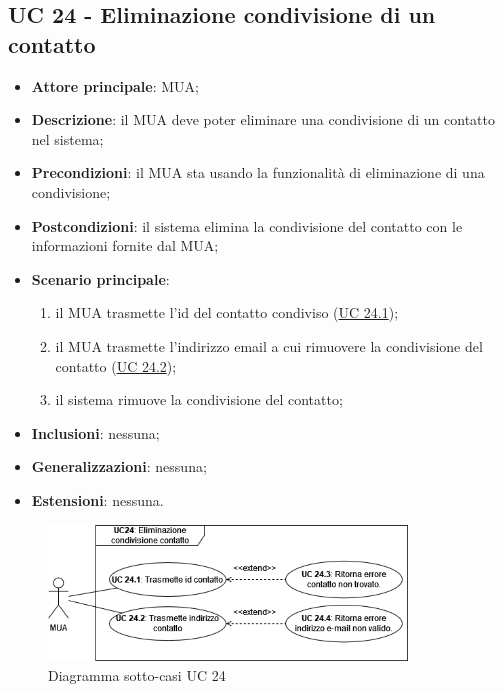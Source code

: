 \subsection{UC 24 - Eliminazione condivisione di un contatto} \label{sec:UC24}

    \begin{itemize}
        \item \textbf{Attore principale}: MUA;
        \item \textbf{Descrizione}: il MUA deve poter eliminare una condivisione di un contatto nel sistema;
        \item \textbf{Precondizioni}: il MUA sta usando la funzionalità di eliminazione di una condivisione;
        \item \textbf{Postcondizioni}: il sistema elimina la condivisione del contatto con le informazioni fornite dal MUA;
        \item \textbf{Scenario principale}:
            \begin{enumerate}
                \item il MUA trasmette l'id del contatto condiviso (\hyperref[sec:UC24.1]{UC 24.1});
                \item il MUA trasmette l'indirizzo email a cui rimuovere la condivisione del contatto (\hyperref[sec:UC24.2]{UC 24.2});
                \item il sistema rimuove la condivisione del contatto;
            \end{enumerate}
        \item \textbf{Inclusioni}: nessuna;
        \item \textbf{Generalizzazioni}: nessuna;
        \item \textbf{Estensioni}: nessuna.
    \end{itemize}

    \begin{figure}[H]
        \includegraphics[width=0.85\textwidth]{sections/uc_imgs/UC24.png}
        \centering
        \caption{Diagramma sotto-casi UC 24}
    \end{figure}

